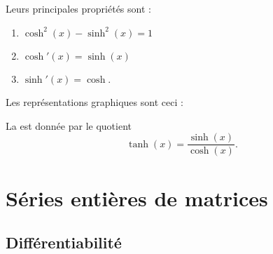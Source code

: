 Leurs principales propriétés sont :
\begin{enumerate}
    \item
        \( \cosh^2(x)-\sinh^2(x)=1\)
    \item
        \( \cosh'(x)=\sinh(x)\) 
    \item
        \( \sinh'(x)=\cosh\).
\end{enumerate}

Les représentations graphiques sont ceci :
\begin{center}
   
\end{center}

La  est donnée par le quotient
\begin{equation}
    \tanh(x)=\frac{ \sinh(x) }{ \cosh(x) }.
\end{equation}

\section{Séries entières de matrices}

\subsection{Différentiabilité}

